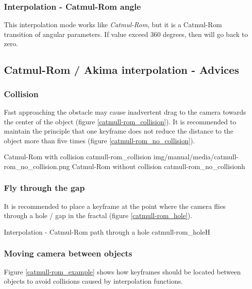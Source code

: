 \subsubsection{Interpolation - Catmul-Rom
	angle}\label{interpolation-catmul-rom-angle}

This interpolation mode works like \emph{Catmul-Rom}, but it is a Catmul-Rom transition of angular
parameters. If value exceed 360 degrees, then will go back to zero.

\subsection{Catmul-Rom / Akima interpolation -
	Advices}\label{catmul-rom-akima-interpolation}

\subsubsection{Collision}\label{collision}

Fast approaching the obstacle may cause inadvertent drag to the camera towards
the center of the object (figure \ref{catmull-rom_collision}). It is recommended to maintain the principle that one
keyframe does not reduce the distance to the object more than five times (figure \ref{catmull-rom_no_collision}).

{Catmul-Rom with collision}
{catmull-rom_collision}
{img/manual/media/catmull-rom_no_collision.png}
{Catmul-Rom without collision}
{catmull-rom_no_collision}{h}

\subsubsection{Fly through the gap}\label{fly-through-the-gap}

It is recommended to place a keyframe at the point where the camera flies
through a hole / gap in the fractal (figure \ref{catmull-rom_hole}).

{Interpolation - Catmul-Rom path through a hole}
{catmull-rom_hole}{H}

\subsubsection{Moving camera between
	objects}\label{proper-conduct-cameras-between-objects}

Figure \ref{catmull-rom_example} shows how keyframes should be located between objects to avoid collisions caused by interpolation functions.

